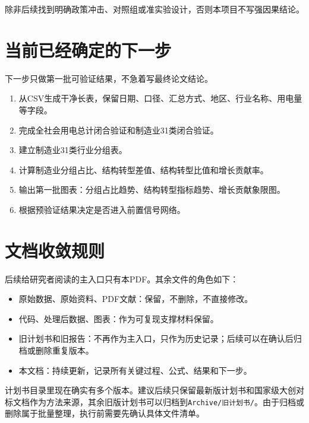 \documentclass[UTF8,a4paper,11pt]{ctexart}
\begin{document}
除非后续找到明确政策冲击、对照组或准实验设计，否则本项目不写强因果结论。

\section{当前已经确定的下一步}

下一步只做第一批可验证结果，不急着写最终论文结论。

\begin{enumerate}
  \item 从CSV生成干净长表，保留日期、口径、汇总方式、地区、行业名称、用电量等字段。
  \item 完成全社会用电总计闭合验证和制造业31类闭合验证。
  \item 建立制造业31类行业分组表。
  \item 计算制造业分组占比、结构转型差值、结构转型比值和增长贡献率。
  \item 输出第一批图表：分组占比趋势、结构转型指标趋势、增长贡献象限图。
  \item 根据预验证结果决定是否进入前置信号网络。
\end{enumerate}

\section{文档收敛规则}

后续给研究者阅读的主入口只有本PDF。其余文件的角色如下：

\begin{itemize}
  \item 原始数据、原始资料、PDF文献：保留，不删除，不直接修改。
  \item 代码、处理后数据、图表：作为可复现支撑材料保留。
  \item 旧计划书和旧报告：不再作为主入口，只作为历史记录；后续可以在确认后归档或删除重复版本。
  \item 本文档：持续更新，记录所有关键过程、公式、结果和下一步。
\end{itemize}

计划书目录里现在确实有多个版本。建议后续只保留最新版计划书和国家级大创对标文档作为方法来源，其余旧版计划书可以归档到\texttt{Archive/旧计划书/}。由于归档或删除属于批量整理，执行前需要先确认具体文件清单。
\end{document}
